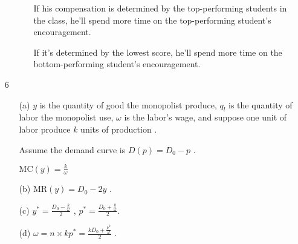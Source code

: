 \documentclass{article}
\begin{document}
\begin{enumerate}
\begin{enumerate}
\begin{enumerate}
            If his compensation is determined by the top-performing students in the class, he'll spend more time on the top-performing student's encouragement. \par
            If it's determined by the lowest score, he'll spend more time on the bottom-performing student's encouragement.
        \end{enumerate}
    \end{enumerate}
    \item[6] \begin{enumerate}
        \item[(a)] $y$ is the quantity of good the monopolist produce, $q_l$ is the quantity of labor the monopolist use, $\omega$ is the labor's wage, and suppose one unit of labor produce $k$ units of production . \par
        Assume the demand curve is $D(p)=D_0-p$ . \par
        $\text{MC}(y)=\frac{k}{\omega}$
        \item[(b)] $\text{MR}(y)=D_0-2y$ .
        \item[(c)] $y^{*}=\frac{D_0-\frac{k}{\omega}}{2}$ , $p^{*}=\frac{D_0+\frac{k}{\omega}}{2}$.
        \item[(d)] $\omega=n\times kp^{*}=\frac{kD_0+\frac{k^2}{\omega}}{2}$ .
    \end{enumerate}
\end{enumerate}
\end{document}
